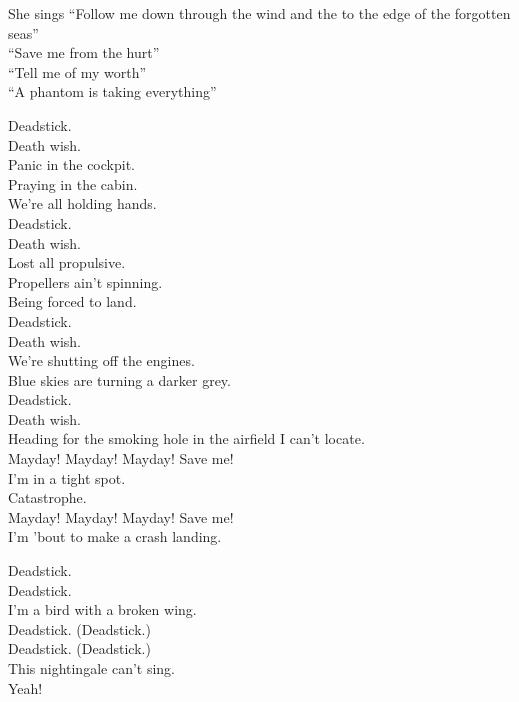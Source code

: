 She sings ``Follow me down through the wind and the  to the edge of the forgotten seas'' \\
``Save me from the hurt'' \\
``Tell me of my worth'' \\
``A phantom is taking everything'' \\


Deadstick. \\
Death wish. \\
Panic in the cockpit. \\
Praying in the cabin. \\
We're all holding hands. \\
Deadstick. \\
Death wish. \\
Lost all propulsive. \\
Propellers ain't spinning. \\
Being forced to land. \\
Deadstick. \\
Death wish. \\
We're shutting off the engines. \\
Blue skies are turning a darker grey. \\
Deadstick. \\
Death wish. \\
Heading for the smoking hole in the airfield I can't locate. \\

Mayday! Mayday! Mayday! Save me! \\
I'm in a tight spot. \\
Catastrophe. \\
Mayday! Mayday! Mayday! Save me! \\
I'm 'bout to make a crash landing. \\


Deadstick. \\
Deadstick. \\
I'm a bird with a broken wing. \\
Deadstick. (Deadstick.) \\
Deadstick. (Deadstick.) \\
This nightingale can't sing. \\
Yeah! \\


